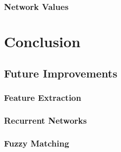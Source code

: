\documentclass[12pt]{article}
\begin{document}
\subsubsection{Network Values}

\section{Conclusion}

\subsection{Future Improvements}

\subsubsection{Feature Extraction}


\subsubsection{Recurrent Networks}

\subsubsection{Fuzzy Matching}


\newpage


\end{document}
